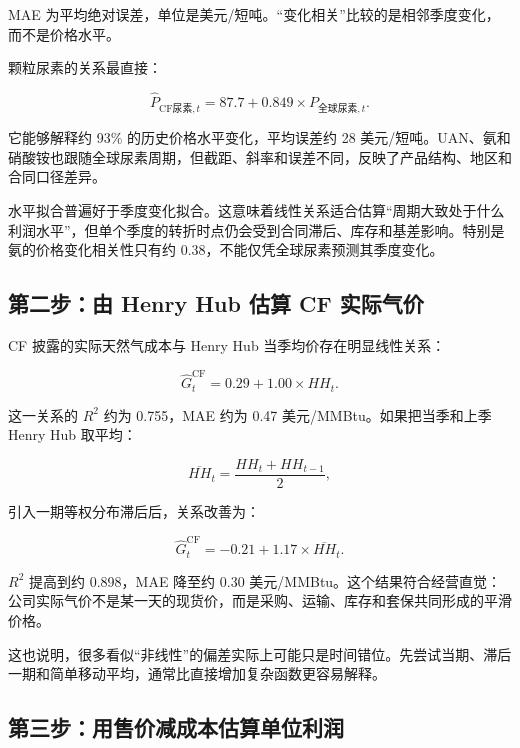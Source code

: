 \documentclass[11pt,a4paper]{ctexart}
\begin{document}
MAE 为平均绝对误差，单位是美元/短吨。“变化相关”比较的是相邻季度变化，而不是价格水平。

颗粒尿素的关系最直接：

\begin{equation*}
\widehat{P}_{\text{CF尿素},t}
=87.7+0.849\times P_{\text{全球尿素},t}.
\end{equation*}

它能够解释约 93\% 的历史价格水平变化，平均误差约 28 美元/短吨。UAN、氨和硝酸铵也跟随全球尿素周期，但截距、斜率和误差不同，反映了产品结构、地区和合同口径差异。

水平拟合普遍好于季度变化拟合。这意味着线性关系适合估算“周期大致处于什么利润水平”，但单个季度的转折时点仍会受到合同滞后、库存和基差影响。特别是氨的价格变化相关性只有约 0.38，不能仅凭全球尿素预测其季度变化。

\subsection{第二步：由 Henry Hub 估算 CF 实际气价}

CF 披露的实际天然气成本与 Henry Hub 当季均价存在明显线性关系：

\begin{equation*}
\widehat{G}^{\text{CF}}_t
=0.29+1.00\times HH_t.
\end{equation*}

这一关系的 $R^2$ 约为 0.755，MAE 约为 0.47 美元/MMBtu。如果把当季和上季 Henry Hub 取平均：

\begin{equation*}
\overline{HH}_t=\frac{HH_t+HH_{t-1}}{2},
\end{equation*}

引入一期等权分布滞后后，关系改善为：

\begin{equation*}
\widehat{G}^{\text{CF}}_t
=-0.21+1.17\times\overline{HH}_t.
\end{equation*}

$R^2$ 提高到约 0.898，MAE 降至约 0.30 美元/MMBtu。这个结果符合经营直觉：公司实际气价不是某一天的现货价，而是采购、运输、库存和套保共同形成的平滑价格。

这也说明，很多看似“非线性”的偏差实际上可能只是时间错位。先尝试当期、滞后一期和简单移动平均，通常比直接增加复杂函数更容易解释。

\subsection{第三步：用售价减成本估算单位利润}
\end{document}
